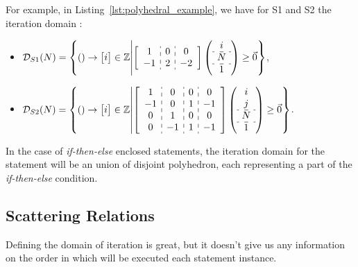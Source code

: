 \documentclass[paper=a4, fontsize=11.5pt]{scrartcl}
\numberwithin{equation}{section}        %
\numberwithin{figure}{section}          %
\numberwithin{table}{section}               %
\begin{document}
        For example, in Listing~\ref{lst:polyhedral_example}, we have for
        S1 and S2 the iteration domain :
        \begin{itemize}
            \item[]$ \mathcal{D}_{S1}(N) = \left\{() \to \begin{bmatrix}i\end{bmatrix} \in \mathbb{Z} \middle|
            \left[\begin{array}{c:c:c}
                    1 & 0 & 0 \\
                    -1 & 2 & -2
            \end{array}\right]
            \left(\begin{array}{c}
                    i \\ \hdashline
                    N \\ \hdashline
                    1 
            \end{array}\right)
            \geq \vec{0}
            \right\} $,
        
            \item[]$ \mathcal{D}_{S2}(N) = \left\{() \to \begin{bmatrix}i\end{bmatrix} \in \mathbb{Z} \middle|
            \left[\begin{array}{c:c:c:c}
                    1 & 0 & 0 & 0\\
                    -1 & 0 & 1 & -1\\
                    0 & 1 & 0 & 0\\
                    0 & -1 & 1 & -1
            \end{array}\right]
            \left(\begin{array}{c}
                    i \\
                    j \\ \hdashline
                    N \\ \hdashline
                    1 
            \end{array}\right)
            \geq \vec{0}
            \right\} $.
        \end{itemize}

        In the case of \textit{if-then-else} enclosed statements, the iteration domain
        for the statement will be an union of disjoint polyhedron, each representing a part
        of the \textit{if-then-else} condition.

    \subsection{Scattering Relations}
        Defining the domain of iteration is great, but it doesn't give us any information
        on the order in which will be executed each statement instance.
\end{document}
